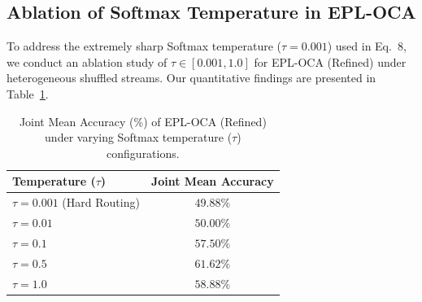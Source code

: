 \begin{table}[t]
\caption{Physical CPU execution latency (ms per sample) and relative execution overhead compared to a standard single-pass expert forward pass.}
\label{tab:latency_results}
\vskip 0.15in
\begin{center}
\begin{small}
\begin{sc}
\end{sc}
\end{small}
\end{center}
\vskip -0.1in
\end{table}

\subsection{Ablation of Softmax Temperature in EPL-OCA}
To address the extremely sharp Softmax temperature ($\tau = 0.001$) used in Eq.~8, we conduct an ablation study of $\tau \in [0.001, 1.0]$ for EPL-OCA (Refined) under heterogeneous shuffled streams. Our quantitative findings are presented in Table~\ref{tab:temperature_results}.

\begin{table}[h]
\caption{Joint Mean Accuracy (\%) of EPL-OCA (Refined) under varying Softmax temperature ($\tau$) configurations.}
\label{tab:temperature_results}
\vskip 0.15in
\begin{center}
\begin{small}
\begin{sc}
\begin{tabular}{lc}
\toprule
Temperature ($\tau$) & Joint Mean Accuracy \\
\midrule
$\tau = 0.001$ (Hard Routing) & $49.88\%$ \\
$\tau = 0.01$  & $50.00\%$ \\
$\tau = 0.1$   & $57.50\%$ \\
$\tau = 0.5$   & $61.62\%$ \\
$\tau = 1.0$   & $58.88\%$ \\
\bottomrule
\end{tabular}
\end{sc}
\end{small}
\end{center}
\vskip -0.1in
\end{table}

